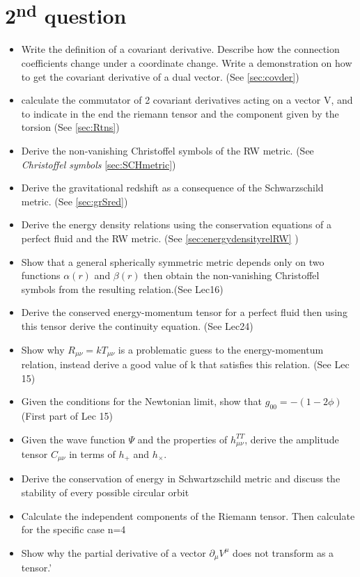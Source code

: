 \section{2\textsuperscript{nd} question}

\begin{itemize}
	\item Write the definition of a covariant derivative. Describe how the connection coefficients change under a coordinate change. Write a demonstration on how to get the covariant derivative of a dual vector. (See \ref{sec:covder})
	\item calculate the commutator of 2 covariant derivatives acting on a vector V, and to indicate in the end the riemann tensor and the component given by the torsion (See \ref{sec:Rtns})
	\item Derive the non-vanishing Christoffel symbols of the RW metric. (See \emph{Christoffel symbols} \ref{sec:SCHmetric})
	\item Derive the gravitational redshift as a consequence of the Schwarzschild metric. (See \ref{sec:grSred})
	\item Derive the energy density relations using the conservation equations of a perfect fluid and the RW metric. (See \ref{sec:energydensityrelRW} )
\item Show that a general spherically symmetric metric depends only on two functions $\alpha \left( r \right)$ and $\beta \left( r \right)$ then obtain the non-vanishing Christoffel symbols from the resulting relation.(See Lec16)
\item Derive the conserved energy-momentum tensor for a perfect fluid then using this tensor derive the continuity equation. (See Lec24)
\item Show why $R_{\mu \nu } = k T_{\mu \nu }$ is a problematic guess to the energy-momentum relation, instead derive a good value of k that satisfies this relation. (See Lec 15)
\item Given the conditions for the Newtonian limit, show that $g_{00 } = - \left( 1-2\phi  \right) $ (First part of Lec 15)
\item Given the wave function $\Psi $ and the properties of $h^{TT}_{\mu \nu }$, derive the amplitude tensor $C_{\mu \nu }$ in terms of $h_{+}$ and $h_{\times}$.
\item Derive the conservation of energy in Schwartzschild metric and discuss the stability of every possible circular orbit
\item Calculate the independent components of the Riemann tensor. Then calculate for the specific case n=4
\item Show why the partial derivative of a vector $\partial_{\mu }V^{\mu }$ does not transform as a tensor.’


\end{itemize}
